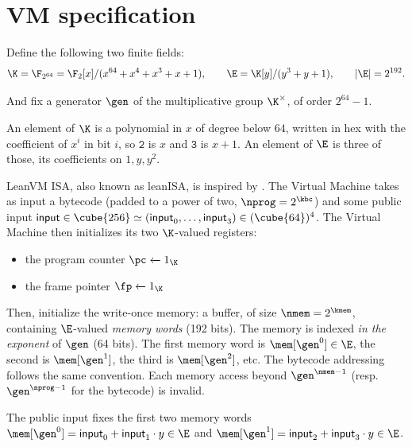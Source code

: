 \section{VM specification}\label{sec:vm}

Define the following two finite fields:
\[
  \K=\F_{2^{64}}=\F_2[x]/(x^{64}+x^4+x^3+x+1),
  \qquad
  \E=\K[y]/(y^3+y+1),
  \qquad |\E|=2^{192}.
\]

And fix a generator $\gen$ of the multiplicative group $\K^{\times}$, of order $2^{64}-1$.

An element of $\K$ is a polynomial in $x$ of degree below $64$, written in hex with the coefficient of $x^{i}$ in bit $i$, so $\mathtt{2}$ is $x$ and $\mathtt{3}$ is $x+1$. An element of $\E$ is three of those, its coefficients on $1,y,y^{2}$.

\vspace{5mm}

LeanVM ISA, also known as leanISA, is inspired by \cite{cairo}. The Virtual Machine takes as input a bytecode (padded to a power of two, $\nprog = 2^{\kbc}$) and some public input $\textsf{input} \in \cube{256} \simeq (\textsf{input}_0, \dots, \textsf{input}_3) \in (\cube{64})^4$. The Virtual Machine then initializes its two $\K$-valued registers:
\begin{itemize}
  \item the program counter $\pc \xleftarrow{} 1_\K$
  \item the frame pointer $\fp \xleftarrow{} 1_\K$
\end{itemize}

Then, initialize the write-once memory: a buffer, of size $\nmem = 2^{\kmem}$, containing $\E$-valued \textit{memory words} (192 bits). The memory is indexed \textit{in the exponent} of $\gen$ (64 bits). The first memory word is $\mem[\gen^0] \in \E$, the second is $\mem[\gen^1]$, the third is $\mem[\gen^2]$, etc. The bytecode addressing follows the same convention. Each memory access beyond $\gen^{\nmem - 1}$ (resp. $\gen^{\nprog - 1}$ for the bytecode) is invalid.

The public input fixes the first two memory words $\mem[\gen^0] = \textsf{input}_0 + \textsf{input}_1 \cdot y \in \E$ and $\mem[\gen^1] = \textsf{input}_2 + \textsf{input}_3 \cdot y \in \E$.

